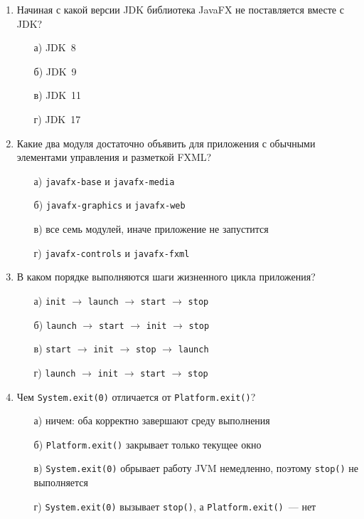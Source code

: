 \testzadaniya

\begin{enumerate}

\item Начиная с какой версии JDK библиотека JavaFX не поставляется вместе с JDK?
  \begin{enumerate}
    \item[а)] JDK~8
    \item[б)] JDK~9
    \item[в)] JDK~11
    \item[г)] JDK~17
  \end{enumerate}

\item Какие два модуля достаточно объявить для приложения с обычными элементами
      управления и разметкой FXML?
  \begin{enumerate}
    \item[а)] \texttt{javafx-base} и \texttt{javafx-media}
    \item[б)] \texttt{javafx-graphics} и \texttt{javafx-web}
    \item[в)] все семь модулей, иначе приложение не запустится
    \item[г)] \texttt{javafx-controls} и \texttt{javafx-fxml}
  \end{enumerate}

\item В каком порядке выполняются шаги жизненного цикла приложения?
  \begin{enumerate}
    \item[а)] \texttt{init} $\to$ \texttt{launch} $\to$ \texttt{start} $\to$ \texttt{stop}
    \item[б)] \texttt{launch} $\to$ \texttt{start} $\to$ \texttt{init} $\to$ \texttt{stop}
    \item[в)] \texttt{start} $\to$ \texttt{init} $\to$ \texttt{stop} $\to$ \texttt{launch}
    \item[г)] \texttt{launch} $\to$ \texttt{init} $\to$ \texttt{start} $\to$ \texttt{stop}
  \end{enumerate}

\item Чем \texttt{System.exit(0)} отличается от \texttt{Platform.exit()}?
  \begin{enumerate}
    \item[а)] ничем: оба корректно завершают среду выполнения
    \item[б)] \texttt{Platform.exit()} закрывает только текущее окно
    \item[в)] \texttt{System.exit(0)} обрывает работу JVM немедленно, поэтому
              \texttt{stop()} не выполняется
    \item[г)] \texttt{System.exit(0)} вызывает \texttt{stop()}, а
              \texttt{Platform.exit()}~--- нет
  \end{enumerate}


\end{enumerate}
